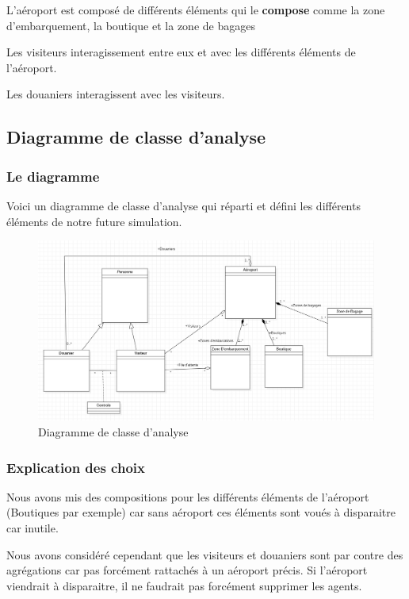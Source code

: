 \documentclass[12pt,french]{article} %
\begin{document}
L'aéroport est composé de différents éléments qui le \textbf{compose} comme la zone d'embarquement, la boutique et la zone de bagages

Les visiteurs interagissement entre eux et avec les différents éléments de l'aéroport.

Les douaniers interagissent avec les visiteurs. 


\subsection{Diagramme de classe d'analyse}

\subsubsection{Le diagramme}

Voici un diagramme de classe d'analyse qui réparti et défini les différents éléments de notre future simulation.

\begin{figure}[H]
	\centering
	\includegraphics[scale=0.4]{analyse.png}
	\caption{Diagramme de classe d'analyse}    
\end{figure}

\subsubsection{Explication des choix}

Nous avons mis des compositions pour les différents éléments de l'aéroport (Boutiques par exemple) car sans aéroport ces éléments sont voués à disparaitre car inutile.

Nous avons considéré cependant que les visiteurs et douaniers sont par contre des agrégations car pas forcément rattachés à un aéroport précis. Si l'aéroport viendrait à disparaitre, il ne faudrait pas forcément supprimer les agents.
\end{document}
